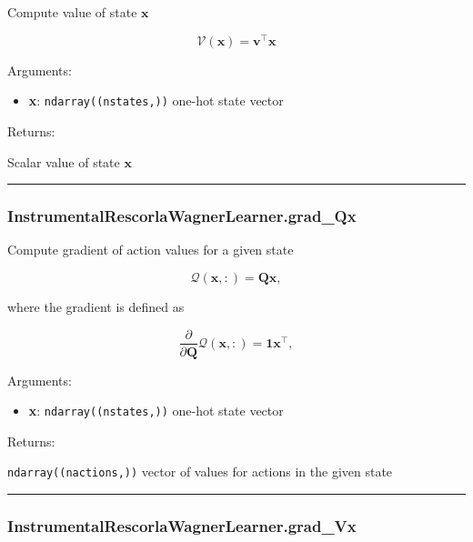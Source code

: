 Compute value of state \(\mathbf x\)

\[
\mathcal V(\mathbf x) = \mathbf v^\top \mathbf x
\]

Arguments:

\begin{itemize}
\tightlist
\item
  \textbf{x}: \texttt{ndarray((nstates,))} one-hot state vector
\end{itemize}

Returns:

Scalar value of state \(\mathbf x\)

\begin{center}\rule{0.5\linewidth}{\linethickness}\end{center}

\subsubsection{InstrumentalRescorlaWagnerLearner.grad\_Qx}\label{instrumentalrescorlawagnerlearner.grad_qx}

\begin{Shaded}
\begin{Highlighting}[]
\end{Highlighting}
\end{Shaded}

Compute gradient of action values for a given state

\[
\mathcal Q(\mathbf x, :) = \mathbf Q \mathbf x,
\]

where the gradient is defined as

\[
\frac{\partial}{\partial \mathbf Q} \mathcal Q(\mathbf x, :) = \mathbf 1 \mathbf x^\top,
\]

Arguments:

\begin{itemize}
\tightlist
\item
  \textbf{x}: \texttt{ndarray((nstates,))} one-hot state vector
\end{itemize}

Returns:

\texttt{ndarray((nactions,))} vector of values for actions in the given
state

\begin{center}\rule{0.5\linewidth}{\linethickness}\end{center}

\subsubsection{InstrumentalRescorlaWagnerLearner.grad\_Vx}\label{instrumentalrescorlawagnerlearner.grad_vx}

